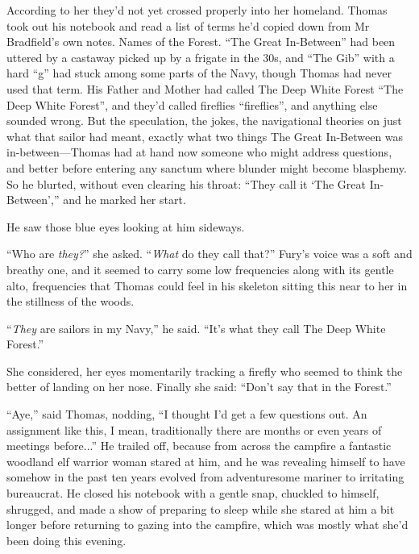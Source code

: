 \documentclass[11pt,a5paper]{article}
\begin{document}
According to her they'd not yet crossed properly into her homeland. Thomas took out his notebook and read a list of terms he'd copied down from Mr Bradfield's own notes. Names of the Forest. ``The Great In-Between'' had been uttered by a castaway picked up by a frigate in the 30s, and ``The Gib'' with a hard ``g'' had stuck among some parts of the Navy, though Thomas had never used that term. His Father and Mother had called The Deep White Forest ``The Deep White Forest'', and they'd called fireflies ``fireflies'', and anything else sounded wrong. But the speculation, the jokes, the navigational theories on just what that sailor had meant, exactly what two things The Great In-Between was in-between---Thomas had at hand now someone who might address questions, and better before entering any sanctum where blunder might become blasphemy. So he blurted, without even clearing his throat: ``They call it `The Great In-Between','' and he marked her start.

He saw those blue eyes looking at him sideways.

``Who are \emph{they?}'' she asked. ``\emph{What} do they call that?'' Fury's voice was a soft and breathy one, and it seemed to carry some low frequencies along with its gentle alto, frequencies that Thomas could feel in his skeleton sitting this near to her in the stillness of the woods.

``\emph{They} are sailors in my Navy,'' he said. ``It's what they call The Deep White Forest.''

She considered, her eyes momentarily tracking a firefly who seemed to think the better of landing on her nose. Finally she said: ``Don't say that in the Forest.''

``Aye,'' said Thomas, nodding, ``I thought I'd get a few questions out. An assignment like this, I mean, traditionally there are months or even years of meetings before...'' He trailed off, because from across the campfire a fantastic woodland elf warrior woman stared at him, and he was revealing himself to have somehow in the past ten years evolved from adventuresome mariner to irritating bureaucrat. He closed his notebook with a gentle snap, chuckled to himself, shrugged, and made a show of preparing to sleep while she stared at him a bit longer before returning to gazing into the campfire, which was mostly what she'd been doing this evening.
\end{document}
